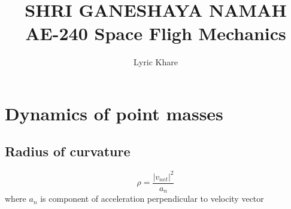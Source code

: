 \documentclass{book}
\title{SHRI GANESHAYA NAMAH\\ AE-240 Space Fligh Mechanics}
\author{Lyric Khare}
\begin{document}
	\maketitle
	\chapter{Dynamics of point masses}
	\section{Radius of curvature}
	\[\rho=\frac{|v_{net}|^2}{a_n} \] where $a_n$ is component of acceleration perpendicular to velocity vector
\end{document}
